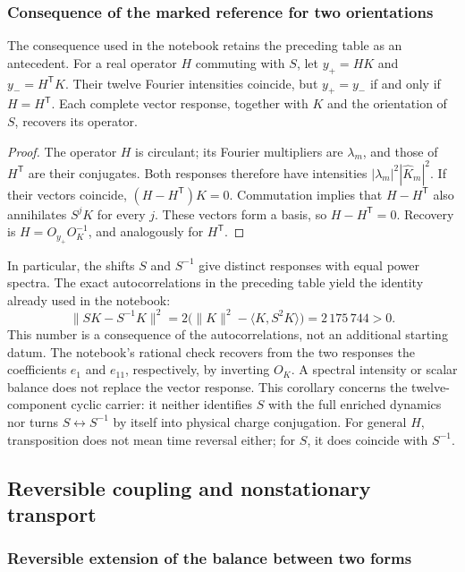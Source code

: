 \subsubsection{Consequence of the marked reference for two orientations}
\label{md:antmem:orientaciones}
The consequence used in the notebook retains the preceding
table as an antecedent. For a real operator \(H\) commuting with
\(S\), let \(y_+=HK\) and \(y_-=H^{\mathsf T}K\).
Their twelve Fourier intensities coincide, but \(y_+=y_-\) if and only
if \(H=H^{\mathsf T}\). Each complete vector response, together with
\(K\) and the orientation of \(S\), recovers its operator.
\begin{proof}
The operator \(H\) is circulant; its Fourier multipliers are
\(\lambda_m\), and those of \(H^{\mathsf T}\) are their conjugates.
Both responses therefore have intensities
\(|\lambda_m|^2|\widehat K_m|^2\).
If their vectors coincide, \((H-H^{\mathsf T})K=0\).
Commutation implies that \(H-H^{\mathsf T}\) also annihilates \(S^jK\)
for every \(j\). These vectors form a basis, so
\(H-H^{\mathsf T}=0\). Recovery is
\(H=O_{y_+}O_K^{-1}\), and analogously for \(H^{\mathsf T}\).
\end{proof}
In particular, the shifts \(S\) and \(S^{-1}\) give distinct responses
with equal power spectra. The exact autocorrelations
in the preceding table yield the identity already used in the notebook:
\begin{equation}
 \|SK-S^{-1}K\|^2
 =2\bigl(\|K\|^2-\langle K,S^2K\rangle\bigr)
 =2\,175\,744>0.
 \label{md:antmem:distancia-orientada}
\end{equation}
This number is a consequence of the autocorrelations, not an additional
starting datum. The notebook's rational check recovers from the two
responses the coefficients \(e_1\) and \(e_{11}\), respectively, by
inverting \(O_K\). A spectral intensity or scalar balance does not
replace the vector response.
This corollary concerns the twelve-component cyclic carrier:
it neither identifies \(S\) with the full enriched dynamics nor turns
\(S\leftrightarrow S^{-1}\) by itself into physical charge conjugation.
For general \(H\), transposition does not mean time reversal either;
for \(S\), it does coincide with \(S^{-1}\).

\subsection{Reversible coupling and nonstationary transport}
\label{md:antmem:acoplamiento}
\subsubsection{Reversible extension of the balance between two forms}

